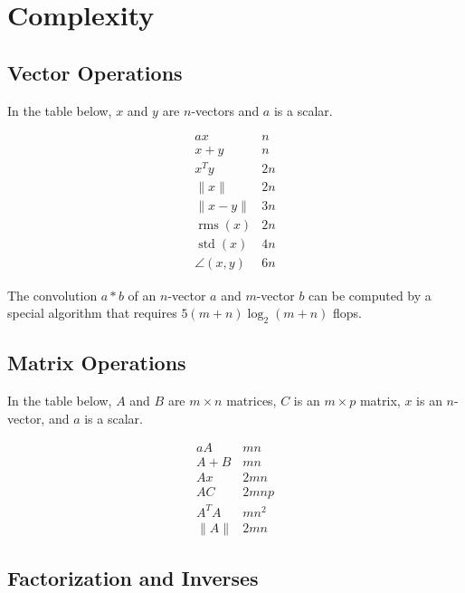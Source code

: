 \chapter{Complexity}

\section{Vector Operations}

In the table below, $ x $ and $ y $ are $ n $-vectors and $ a $ is a scalar.

\begin{equation} \begin{array}{ll}a x & n \\ x+y & n \\ x^{T} y & 2 n \\ \|x\| & 2 n \\ \|x-y\| & 3 n \\ \operatorname{rms}(x) & 2 n \\ \operatorname{std}(x) & 4 n \\ \angle(x, y) & 6 n\end{array} \end{equation}


The convolution $ a * b $ of an $ n $-vector $ a $ and $ m $-vector $ b $ can be computed by a special algorithm that requires $ 5(m+n) \log _{2}(m+n) $ flops.

\section{Matrix Operations}

In the table below, $ A $ and $ B $ are $ m \times n $ matrices, $ C $ is an $ m \times p $ matrix, $ x $ is an $ n $-vector, and $ a $ is a scalar.

\begin{equation} \begin{array}{ll}a A & m n \\ A+B & m n \\ A x & 2 m n \\ A C & 2 m n p \\ A^{T} A & m n^{2} \\ \|A\| & 2 m n\end{array} \end{equation}

\section{Factorization and Inverses}

